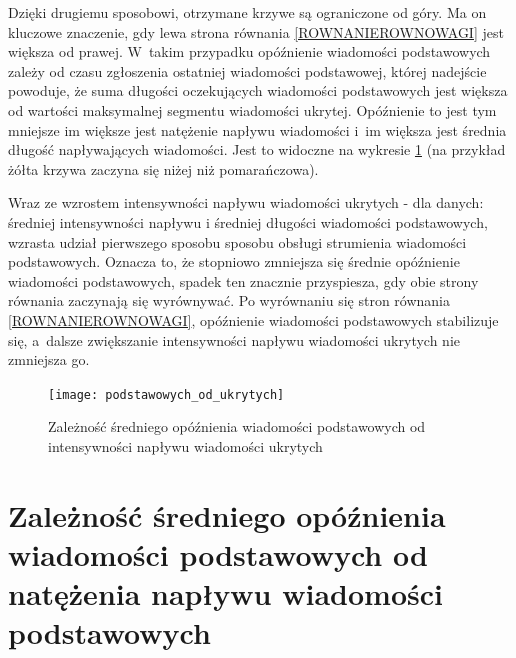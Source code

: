\documentclass[a4paper, twoside, openright, 12pt]{report}
\begin{document}
            Dzięki drugiemu sposobowi, otrzymane krzywe są ograniczone od góry.
            Ma on kluczowe znaczenie, gdy lewa strona równania \ref{ROWNANIEROWNOWAGI} jest większa od prawej.
            W~takim przypadku
            opóźnienie wiadomości podstawowych zależy od czasu zgłoszenia ostatniej
            wiadomości podstawowej, której nadejście powoduje, że suma długości oczekujących
            wiadomości podstawowych jest większa od wartości maksymalnej segmentu wiadomości ukrytej.
            Opóźnienie to jest tym mniejsze im większe jest natężenie napływu wiadomości
            i~im większa jest średnia długość napływających wiadomości. Jest to widoczne na wykresie
            \ref{OPOZNIENIEPODSTAWOWYCHODUKRYTYCH} (na przykład żółta krzywa zaczyna
            się niżej niż pomarańczowa).

            Wraz ze wzrostem intensywności napływu wiadomości ukrytych - dla danych:
            średniej intensywności napływu i średniej długości wiadomości podstawowych, wzrasta udział
            pierwszego sposobu sposobu obsługi strumienia wiadomości podstawowych.
            Oznacza to, że stopniowo zmniejsza się średnie opóźnienie wiadomości podstawowych,
            spadek ten znacznie przyspiesza, gdy obie strony równania zaczynają się wyrównywać.
            Po wyrównaniu się stron równania \ref{ROWNANIEROWNOWAGI},
            opóźnienie wiadomości podstawowych stabilizuje się, a~dalsze zwiększanie
            intensywności napływu wiadomości ukrytych nie zmniejsza go.

        \begin{figure}[h]
                \centering
                \texttt{[image: podstawowych\_od\_ukrytych]}
                \caption{Zależność średniego opóźnienia wiadomości podstawowych od
                    intensywności napływu wiadomości ukrytych}
                \label{OPOZNIENIEPODSTAWOWYCHODUKRYTYCH}
        \end{figure}



    \section{Zależność średniego opóźnienia wiadomości podstawowych od natężenia napływu wiadomości podstawowych} \label{BADANIEDLUGOSCISEGMENTUDANYCHUKRYTYCH}
\end{document}
